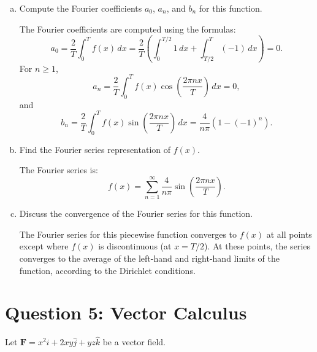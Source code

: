 \documentclass{article}
\begin{document}
\begin{enumerate}[a)]
  \item Compute the Fourier coefficients \( a_0 \), \( a_n \), and \( b_n \) for this function.
  
  The Fourier coefficients are computed using the formulas:
  \[
  a_0 = \frac{2}{T} \int_0^T f(x) \, dx = \frac{2}{T} \left( \int_0^{T/2} 1 \, dx + \int_{T/2}^T (-1) \, dx \right) = 0.
  \]
  For \( n \geq 1 \),
  \[
  a_n = \frac{2}{T} \int_0^T f(x) \cos\left( \frac{2\pi n x}{T} \right) \, dx = 0,
  \]
  and
  \[
  b_n = \frac{2}{T} \int_0^T f(x) \sin\left( \frac{2\pi n x}{T} \right) \, dx = \frac{4}{n\pi} \left( 1 - (-1)^n \right).
  \]

  \item Find the Fourier series representation of \( f(x) \).
  
  The Fourier series is:
  \[
  f(x) = \sum_{n=1}^{\infty} \frac{4}{n\pi} \sin\left( \frac{2\pi n x}{T} \right).
  \]

  \item Discuss the convergence of the Fourier series for this function.
  
  The Fourier series for this piecewise function converges to \( f(x) \) at all points except where \( f(x) \) is discontinuous (at \( x = T/2 \)). At these points, the series converges to the average of the left-hand and right-hand limits of the function, according to the Dirichlet conditions.

\end{enumerate}

\section*{Question 5: Vector Calculus}

Let \( \mathbf{F} = x^2 \hat{i} + 2xy \hat{j} + yz \hat{k} \) be a vector field.
\end{document}
